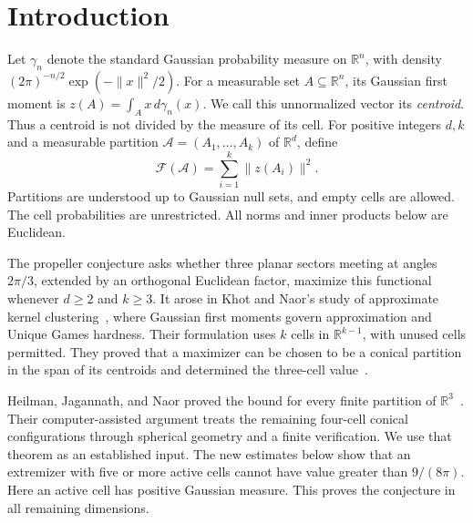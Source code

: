 \begin{abstract}
We prove the Gaussian propeller conjecture: for every finite measurable
partition of a Euclidean space, the sum of the squared lengths of its
Gaussian first moments is at most $9/(8\pi)$.
For dimension at least two and at least three cells, three planar
sectors of angle $2\pi/3$, extended by an orthogonal Euclidean factor,
attain the bound.
\end{abstract}

\section{Introduction}
\label{sec:introduction}
Let $\gamma_n$ denote the standard Gaussian probability measure on
$\mathbb R^n$, with density
$(2\pi)^{-n/2}\exp(-\|x\|^2/2)$.
For a measurable set $A\subseteq\mathbb R^n$, its Gaussian first moment is
$z(A)=\int_A x\,d\gamma_n(x)$. We call this unnormalized vector its
\emph{centroid}. Thus a centroid is not divided by the measure of its
cell. For positive integers $d,k$ and a measurable partition
$\mathcal A=(A_1,\ldots,A_k)$ of $\mathbb R^d$, define
\[
 \mathcal F(\mathcal A)=\sum_{i=1}^k\|z(A_i)\|^2.
\]
Partitions are understood up to Gaussian null sets, and empty cells are
allowed. The cell probabilities are unrestricted. All norms and inner
products below are Euclidean.

The propeller conjecture asks whether three planar sectors meeting at
angles $2\pi/3$, extended by an orthogonal Euclidean factor, maximize
this functional whenever $d\ge2$ and $k\ge3$. It arose in Khot and
Naor's study of approximate kernel clustering~\cite{KhotNaor}, where
Gaussian first moments govern approximation and Unique Games hardness.
Their formulation uses $k$ cells in $\mathbb R^{k-1}$, with unused
cells permitted. They proved that a maximizer can be chosen to be a
conical partition in the span of its centroids and determined the
three-cell value~\cite[Theorem~1.2 and Corollary~3.4]{KhotNaor}.

Heilman, Jagannath, and Naor proved the bound for every finite partition
of $\mathbb R^3$~\cite[Theorem~1.1]{HJN}. Their computer-assisted
argument treats the remaining four-cell conical configurations through
spherical geometry and a finite verification. We use that theorem as
an established input. The new estimates below show that an extremizer with five or more
active cells cannot have value greater than $9/(8\pi)$. Here an active
cell has positive Gaussian measure. This proves the conjecture in all
remaining dimensions.


